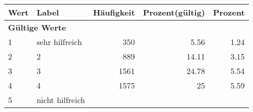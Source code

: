      \begin{longtable}{lXrrr}
     \toprule
     \textbf{Wert} & \textbf{Label} & \textbf{Häufigkeit} & \textbf{Prozent(gültig)} & \textbf{Prozent} \\
     \endhead
     \midrule
     \multicolumn{5}{l}{\textbf{Gültige Werte}}\\

     1 &
     \multicolumn{1}{X}{ sehr hilfreich   } &


       \num{350} &
       \num[round-mode=places,round-precision=2]{5.56} &
         \num[round-mode=places,round-precision=2]{1.24} \\

     2 &
     \multicolumn{1}{X}{ 2   } &


       \num{889} &
       \num[round-mode=places,round-precision=2]{14.11} &
         \num[round-mode=places,round-precision=2]{3.15} \\

     3 &
     \multicolumn{1}{X}{ 3   } &


       \num{1561} &
       \num[round-mode=places,round-precision=2]{24.78} &
         \num[round-mode=places,round-precision=2]{5.54} \\

     4 &
     \multicolumn{1}{X}{ 4   } &


       \num{1575} &
       \num[round-mode=places,round-precision=2]{25} &
         \num[round-mode=places,round-precision=2]{5.59} \\

     5 &
     \multicolumn{1}{X}{ nicht hilfreich   } &



\end{longtable}
